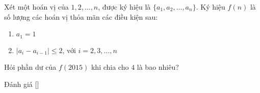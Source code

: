 \ifshowproblem
\begin{problem}\label{problem:TWN-2015-TST3-Q2-P2}
    Xét một hoán vị của \( 1, 2, \ldots, n \), được ký hiệu là \( \{a_1, a_2, \ldots, a_n\} \).  
    Ký hiệu \( f(n) \) là số lượng các hoán vị thỏa mãn các điều kiện sau:
    \begin{enumerate}[topsep=0pt, partopsep=0pt, itemsep=0pt]
        \item \( a_1 = 1 \)
        \item \( |a_i - a_{i-1}| \le 2 \), với \( i = 2, 3, \ldots, n \)
    \end{enumerate}
    
    Hỏi phần dư của \( f(2015) \) khi chia cho \( 4 \) là bao nhiêu?
\end{problem}
\fi

\ifshowinfo
Đánh giá [\textbf{}]\footnotemark
{}
\fi